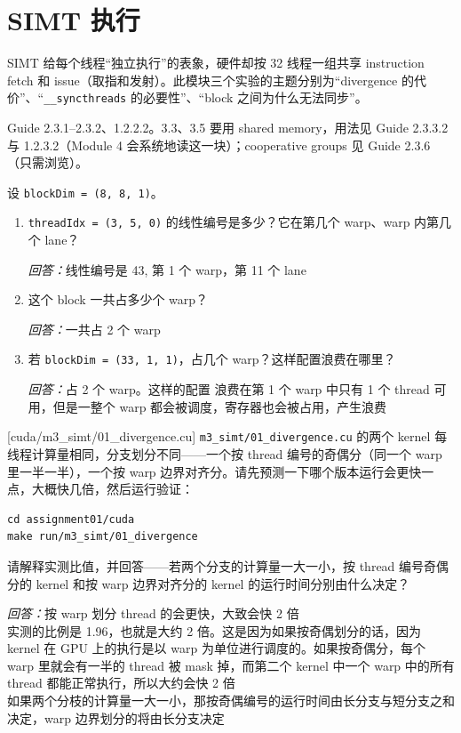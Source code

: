 \documentclass[11pt,a4paper,fontset=none]{ctexart}
\begin{document}
\section{SIMT 执行}

SIMT 给每个线程“独立执行”的表象，硬件却按 32 线程一组共享 instruction fetch 和 issue（取指和发射）。此模块三个实验的主题分别为“divergence 的代价”、“\texttt{\_\_syncthreads} 的必要性”、“block 之间为什么无法同步”。

\begin{reading}
Guide 2.3.1--2.3.2、1.2.2.2。3.3、3.5 要用 shared memory，用法见 Guide 2.3.3.2 与 1.2.3.2（Module 4 会系统地读这一块）；cooperative groups 见 Guide 2.3.6（只需浏览）。
\end{reading}

设 \texttt{blockDim = (8, 8, 1)}。
\begin{enumerate}[label=(\alph*)]
  \item \texttt{threadIdx = (3, 5, 0)} 的线性编号是多少？它在第几个 warp、warp 内第几个 lane？
  \par\noindent\textit{回答：}线性编号是 43, 第 1 个 warp，第 11 个 lane
  \item 这个 block 一共占多少个 warp？
  \par\noindent\textit{回答：}一共占 2 个 warp
  \item 若 \texttt{blockDim = (33, 1, 1)}，占几个 warp？这样配置浪费在哪里？
  \par\noindent\textit{回答：}占 2 个 warp。这样的配置 浪费在第 1 个 warp 中只有 1 个 thread 可用，但是一整个 warp 都会被调度，寄存器也会被占用，产生浪费
\end{enumerate}

[cuda/m3\_simt/01\_divergence.cu]
\texttt{m3\_simt/01\_divergence.cu} 的两个 kernel 每线程计算量相同，分支划分不同——一个按 thread 编号的奇偶分（同一个 warp 里一半一半），一个按 warp 边界对齐分。请先预测一下哪个版本运行会更快一点，大概快几倍，然后运行验证：

\begin{lstlisting}
cd assignment01/cuda
make run/m3_simt/01_divergence
\end{lstlisting}

请解释实测比值，并回答——若两个分支的计算量一大一小，按 thread 编号奇偶分的 kernel 和按 warp 边界对齐分的 kernel 的运行时间分别由什么决定？
\par\noindent\textit{回答：}按 warp 划分 thread 的会更快，大致会快 2 倍\\
实测的比例是 1.96，也就是大约 2 倍。这是因为如果按奇偶划分的话，因为 kernel 在 GPU 上的执行是以 warp 为单位进行调度的。如果按奇偶分，每个 warp 里就会有一半的 thread 被 mask 掉，而第二个 kernel 中一个 warp 中的所有 thread 都能正常执行，所以大约会快 2 倍\\
如果两个分枝的计算量一大一小，那按奇偶编号的运行时间由长分支与短分支之和决定，warp 边界划分的将由长分支决定
\end{document}
